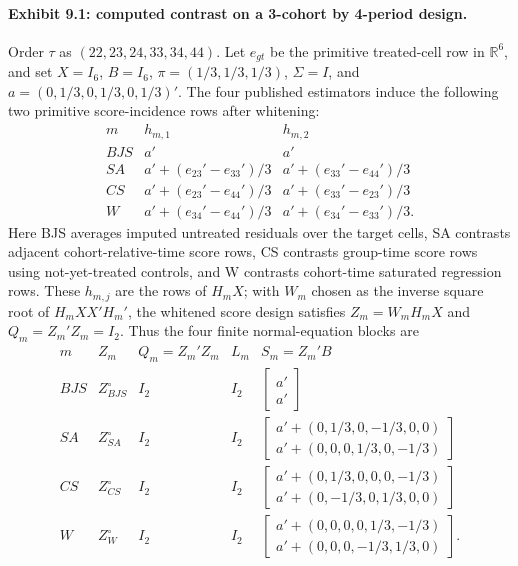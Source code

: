 \documentclass[11pt]{article}
\theoremstyle{definition}
\theoremstyle{plain}
\theoremstyle{remark}
\begin{document}
\paragraph{Exhibit 9.1: computed contrast on a 3-cohort by 4-period design.}
Order \(\tau\) as \((22,23,24,33,34,44)\). Let \(e_{gt}\) be the primitive treated-cell row in \(\mathbb R^6\), and set \(X=I_6\), \(B=I_6\), \(\pi=(1/3,1/3,1/3)\), \(\Sigma=I\), and \(a=(0,1/3,0,1/3,0,1/3)'\). The four published estimators induce the following two primitive score-incidence rows after whitening:
\[
\begin{array}{c|cc}
m & h_{m,1} & h_{m,2}\\ \hline
BJS & a' & a'\\
SA & a'+(e_{23}'-e_{33}')/3 & a'+(e_{33}'-e_{44}')/3\\
CS & a'+(e_{23}'-e_{44}')/3 & a'+(e_{33}'-e_{23}')/3\\
W & a'+(e_{34}'-e_{44}')/3 & a'+(e_{34}'-e_{33}')/3.
\end{array}
\]
Here BJS averages imputed untreated residuals over the target cells, SA contrasts adjacent cohort-relative-time score rows, CS contrasts group-time score rows using not-yet-treated controls, and W contrasts cohort-time saturated regression rows. These \(h_{m,j}\) are the rows of \(H_mX\); with \(W_m\) chosen as the inverse square root of \(H_mXX'H_m'\), the whitened score design satisfies \(Z_m= W_mH_mX\) and \(Q_m=Z_m'Z_m=I_2\). Thus the four finite normal-equation blocks are
\[
\begin{array}{c|c|c|c|c}
m & Z_m & Q_m=Z_m'Z_m & L_m & S_m=Z_m'B \\ \hline
BJS & Z_{BJS}^{\circ} & I_2 & I_2 &
\begin{bmatrix}a'\\ a'\end{bmatrix}\\[3pt]
SA & Z_{SA}^{\circ} & I_2 & I_2 &
\begin{bmatrix}a'+(0,1/3,0,-1/3,0,0)\\ a'+(0,0,0,1/3,0,-1/3)\end{bmatrix}\\[3pt]
CS & Z_{CS}^{\circ} & I_2 & I_2 &
\begin{bmatrix}a'+(0,1/3,0,0,0,-1/3)\\ a'+(0,-1/3,0,1/3,0,0)\end{bmatrix}\\[3pt]
W & Z_W^{\circ} & I_2 & I_2 &
\begin{bmatrix}a'+(0,0,0,0,1/3,-1/3)\\ a'+(0,0,0,-1/3,1/3,0)\end{bmatrix}.
\end{array}
\]
\end{document}
